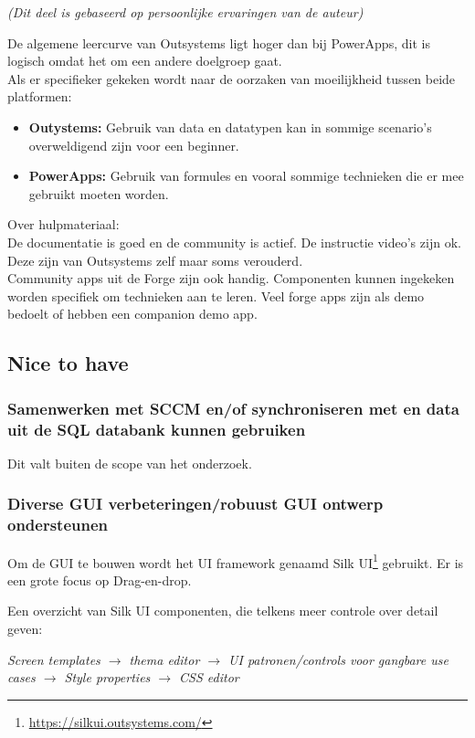\textit{(Dit deel is gebaseerd op persoonlijke ervaringen van de auteur)}

De algemene leercurve van Outsystems ligt hoger dan bij PowerApps, dit is logisch omdat het om een andere doelgroep gaat.\\
Als er specifieker gekeken wordt naar de oorzaken van moeilijkheid tussen beide platformen:
\begin{itemize}
    \item \textbf{Outystems:} Gebruik van data en datatypen kan in sommige scenario's overweldigend zijn voor een beginner.
    \item \textbf{PowerApps:} Gebruik van formules en vooral sommige technieken die er mee gebruikt moeten worden.
\end{itemize}

Over hulpmateriaal:\\
De documentatie is goed en de community is actief. De instructie video's zijn ok. Deze zijn van Outsystems zelf maar soms verouderd.\\
Community apps uit de Forge zijn ook handig. Componenten kunnen ingekeken worden specifiek om technieken aan te leren. Veel forge apps zijn als demo bedoelt of hebben een companion demo app.

\subsection{Nice to have}

\subsubsection{Samenwerken met SCCM en/of synchroniseren met en data uit de SQL databank kunnen gebruiken}

Dit valt buiten de scope van het onderzoek.

\subsubsection{Diverse GUI verbeteringen/robuust GUI ontwerp ondersteunen}

Om de GUI te bouwen wordt het UI framework genaamd Silk UI\footnote{\url{https://silkui.outsystems.com/}} gebruikt. Er is een grote focus op Drag-en-drop.

Een overzicht van Silk UI componenten, die telkens meer controle over detail geven:

\textit{Screen templates $\rightarrow$ thema editor $\rightarrow$ UI patronen/controls voor gangbare use cases $\rightarrow$ Style properties $\rightarrow$ CSS editor}

